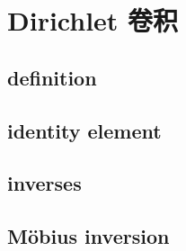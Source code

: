 \section{Dirichlet 卷积}
\label{b3:sec:2502}


\subsection{definition}
\label{b3:subsec:250201}

\subsection{identity element}
\label{b3:subsec:250202}

\subsection{inverses}
\label{b3:subsec:250203}

\subsection{Möbius inversion}
\label{b3:subsec:250204}


